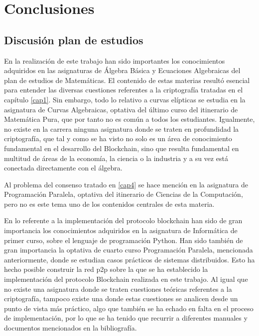 \cleardoublepage

\chapter{Conclusiones}\label{conclusiones}
\section{Discusión plan de estudios}
En la realización de este trabajo han sido importantes los conocimientos adquiridos en las asignaturas de Álgebra Básica y Ecuaciones Algebraicas del plan de estudios de Matemáticas. El contenido de estas materias resultó esencial para entender las diversas cuestiones referentes a la criptografía tratadas en el capítulo \ref{cap1}. Sin embargo, todo lo relativo a curvas elípticas se estudia en la asignatura de Curvas Algebraicas, optativa del último curso del itinerario de Matemática Pura, que por tanto no es común a todos los estudiantes. Igualmente, no existe en la carrera ninguna asignatura donde se traten en profundidad la criptografía, que tal y como se ha visto no solo es un área de conocimiento fundamental en el desarrollo del Blockchain, sino que resulta fundamental en multitud de áreas de la economía, la ciencia o la industria y a su vez está conectada directamente con el álgebra.

Al problema del consenso tratado en \ref{cap4} se hace mención en la asignatura de Programación Paralela, optativa del itinerario de Ciencias de la Computación, pero no es este tema uno de los contenidos centrales de esta materia.

En lo referente a la implementación del protocolo blockchain han sido de gran importancia los conocimientos adquiridos en la asignatura de Informática de primer curso, sobre el lenguaje de programación Python. Han sido también de gran importancia la optativa de cuarto curso Programación Paralela, mencionada anteriormente, donde se estudian casos prácticos de sistemas distribuidos. Esto ha hecho posible construir la red p2p sobre la que se ha establecido la  implementación del protocolo Blockchain realizada en este trabajo. Al igual que no existe una asignatura donde se traten cuestiones teóricas referentes a la criptografía, tampoco existe una donde estas cuestiones se analicen desde un punto de vista más práctico, algo que también se ha echado en falta en el proceso de implementación, por lo que se ha tenido que recurrir a diferentes manuales y documentos mencionados en la bibliografía.  
